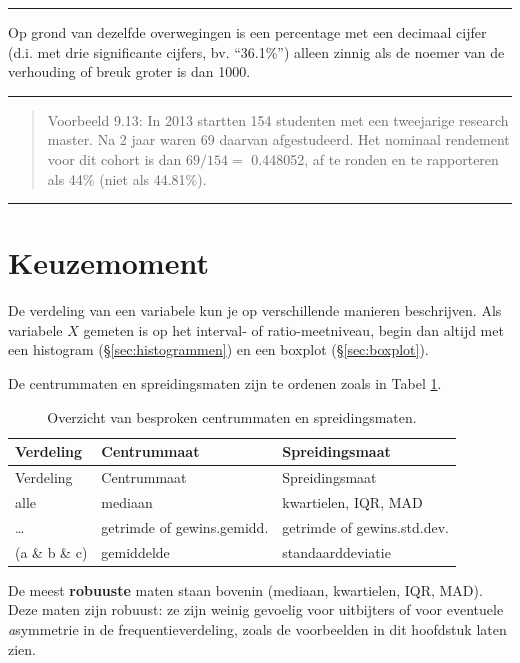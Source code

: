\documentclass[
]{book}
\begin{document}
\begin{center}\rule{0.5\linewidth}{0.5pt}\end{center}

Op grond van dezelfde overwegingen is een percentage met een decimaal
cijfer (d.i. met drie significante cijfers, bv. ``36.1\%'') alleen zinnig
als de noemer van de verhouding of breuk groter is dan 1000.

\begin{center}\rule{0.5\linewidth}{0.5pt}\end{center}

\begin{quote}
Voorbeeld 9.13:
In 2013 startten 154 studenten met een tweejarige research master. Na 2
jaar waren 69 daarvan afgestudeerd. Het nominaal rendement voor dit
cohort is dan \(69/154=\) 0.448052, af te ronden en te rapporteren als 44\%
(niet als 44.81\%).
\end{quote}

\begin{center}\rule{0.5\linewidth}{0.5pt}\end{center}

\hypertarget{sec:robuustefficient}{%
\section{Keuzemoment}\label{sec:robuustefficient}}

De verdeling van een variabele kun je op verschillende manieren
beschrijven.
Als variabele \(X\) gemeten is op het interval- of ratio-meetniveau,
begin dan altijd met een histogram (§\ref{sec:histogrammen})
en een boxplot (§\ref{sec:boxplot}).

De centrummaten en spreidingsmaten zijn te ordenen zoals in
Tabel \ref{tab:centrumspreidingsmaten}.

\begin{longtable}[]{@{}lll@{}}
\caption{\label{tab:centrumspreidingsmaten} Overzicht van besproken centrummaten en spreidingsmaten.}\tabularnewline
\toprule
Verdeling & Centrummaat & Spreidingsmaat\tabularnewline
\midrule
\endfirsthead
\toprule
Verdeling & Centrummaat & Spreidingsmaat\tabularnewline
\midrule
\endhead
alle & mediaan & kwartielen, IQR, MAD\tabularnewline
\ldots{} & getrimde of gewins.gemidd. & getrimde of gewins.std.dev.\tabularnewline
(a \& b \& c) & gemiddelde & standaarddeviatie\tabularnewline
\bottomrule
\end{longtable}

De meest \textbf{robuuste} maten staan
bovenin (mediaan, kwartielen, IQR, MAD). Deze maten zijn robuust: ze
zijn weinig gevoelig voor uitbijters of voor eventuele \emph{a}symmetrie in de
frequentieverdeling, zoals de voorbeelden in dit hoofdstuk laten zien.
\end{document}
